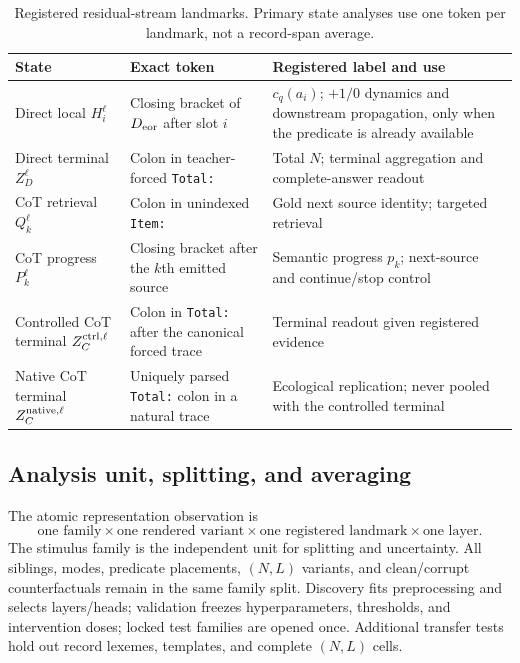 \begin{table}[H]
\centering
\small
\caption{Registered residual-stream landmarks. Primary state analyses use one
token per landmark, not a record-span average.}
\label{tab:landmarks}
\begin{tabularx}{\textwidth}{@{}P{.21\textwidth}P{.43\textwidth}Y@{}}
\toprule
State & Exact token & Registered label and use \\
\midrule
Direct local \(H_i^\ell\)
  & Closing bracket of \(D_{\rm eor}\) after slot \(i\)
  & \(c_q(a_i)\); \(+1/0\) dynamics and downstream propagation, only when the
  predicate is already available \\
Direct terminal \(Z_D^\ell\)
  & Colon in teacher-forced \texttt{Total:}
  & Total \(N\); terminal aggregation and complete-answer readout \\
CoT retrieval \(Q_k^\ell\)
  & Colon in unindexed \texttt{Item:}
  & Gold next source identity; targeted retrieval \\
CoT progress \(P_k^\ell\)
  & Closing bracket after the \(k\)th emitted source
  & Semantic progress \(p_k\); next-source and continue/stop control \\
Controlled CoT terminal \(Z_C^{\rm ctrl,\ell}\)
  & Colon in \texttt{Total:} after the canonical forced trace
  & Terminal readout given registered evidence \\
Native CoT terminal \(Z_C^{\rm native,\ell}\)
  & Uniquely parsed \texttt{Total:} colon in a natural trace
  & Ecological replication; never pooled with the controlled terminal \\
\bottomrule
\end{tabularx}
\end{table}

\subsection{Analysis unit, splitting, and averaging}

The atomic representation observation is
\[
  \text{one family}\times\text{one rendered variant}\times
  \text{one registered landmark}\times\text{one layer}.
\]
The stimulus family is the independent unit for splitting and uncertainty.
All siblings, modes, predicate placements, \((N,L)\) variants, and
clean/corrupt counterfactuals remain in the same family split. Discovery fits
preprocessing and selects layers/heads; validation freezes hyperparameters,
thresholds, and intervention doses; locked test families are opened once.
Additional transfer tests hold out record lexemes, templates, and complete
\((N,L)\) cells.

